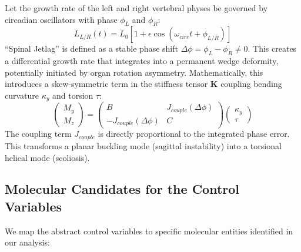 Let the growth rate of the left and right vertebral physes be governed by circadian oscillators with phase $\phi_L$ and $\phi_R$:
\begin{equation}
\dot{L}_{L/R}(t) = \dot{L}_0 [ 1 + \epsilon \cos(\omega_{circ} t + \phi_{L/R}) ]
\end{equation}
``Spinal Jetlag'' is defined as a stable phase shift $\Delta \phi = \phi_L - \phi_R \neq 0$. This creates a differential growth rate that integrates into a permanent wedge deformity, potentially initiated by organ rotation asymmetry.
Mathematically, this introduces a skew-symmetric term in the stiffness tensor $\mathbf{K}$ coupling bending curvature $\kappa_y$ and torsion $\tau$:
\begin{equation}
\begin{pmatrix} M_y \\ M_z \end{pmatrix} = \begin{pmatrix} B & J_{couple}(\Delta \phi) \\ -J_{couple}(\Delta \phi) & C \end{pmatrix} \begin{pmatrix} \kappa_y \\ \tau \end{pmatrix}
\end{equation}
The coupling term $J_{couple}$ is directly proportional to the integrated phase error. This transforms a planar buckling mode (sagittal instability) into a torsional helical mode (scoliosis).

\subsection{Molecular Candidates for the Control Variables}

We map the abstract control variables to specific molecular entities identified in our analysis:

